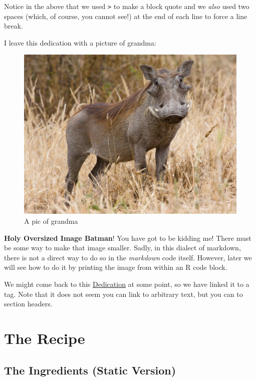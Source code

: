 \documentclass[
]{article}
\begin{document}
Notice in the above that we used \texttt{\textgreater{}} to make a block
quote and we \emph{also} used two spaces (which, of course, you cannot
see!) at the end of each line to force a line break.

I leave this dedication with a picture of grandma:

\begin{figure}
\centering
\includegraphics{figures/Warthog4.jpg}
\caption{A pic of grandma}
\end{figure}

\textbf{Holy Oversized Image Batman}! You have got to be kidding me!
There must be some way to make that image smaller. Sadly, in this
dialect of markdown, there is not a direct way to do so in the
\emph{markdown} code itself. However, later we will see how to do it by
printing the image from within an R code block.

We might come back to this \protect\hyperlink{tag-it}{Dedication} at
some point, so we have linked it to a tag. Note that it does not seem
you can link to arbitrary text, but you can to section headers.

\hypertarget{the-recipe}{%
\section{The Recipe}\label{the-recipe}}

\hypertarget{the-ingredients-static-version}{%
\subsection{The Ingredients (Static
Version)}\label{the-ingredients-static-version}}
\end{document}
